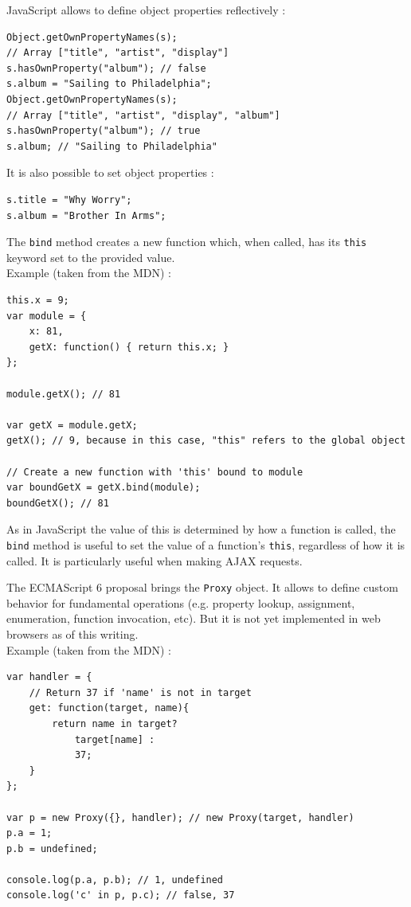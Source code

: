 \documentclass[a4paper,10pt]{article}
\begin{document}
\bigskip
JavaScript allows to define object properties reflectively :
\begin{lstlisting}
Object.getOwnPropertyNames(s);
// Array ["title", "artist", "display"]
s.hasOwnProperty("album"); // false
s.album = "Sailing to Philadelphia";
Object.getOwnPropertyNames(s);
// Array ["title", "artist", "display", "album"]
s.hasOwnProperty("album"); // true
s.album; // "Sailing to Philadelphia"
\end{lstlisting}

It is also possible to set object properties :
\begin{lstlisting}
s.title = "Why Worry";
s.album = "Brother In Arms";
\end{lstlisting}


\medskip
\label{bind}
The \lstinline|bind| method creates a new function which, when called, has its \lstinline|this| keyword set to the provided value. \\
Example (taken from the MDN) : \\
\begin{lstlisting}
this.x = 9;
var module = {
	x: 81,
	getX: function() { return this.x; }
};

module.getX(); // 81

var getX = module.getX;
getX(); // 9, because in this case, "this" refers to the global object

// Create a new function with 'this' bound to module
var boundGetX = getX.bind(module);
boundGetX(); // 81
\end{lstlisting}

As in JavaScript the value of this is determined by how a function is called, the \lstinline|bind| method is useful to set the value of a function’s \lstinline|this|, regardless of how it is called.
It is particularly useful when making AJAX requests.


The ECMAScript 6 proposal brings the \lstinline|Proxy| object.
It allows to define custom behavior for fundamental operations (e.g. property lookup, assignment, enumeration, function invocation, etc).
But it is not yet implemented in web browsers as of this writing. \\
Example (taken from the MDN) : \\
\begin{lstlisting}
var handler = {
    // Return 37 if 'name' is not in target
    get: function(target, name){
        return name in target?
            target[name] :
            37;
    }
};

var p = new Proxy({}, handler); // new Proxy(target, handler)
p.a = 1;
p.b = undefined;

console.log(p.a, p.b); // 1, undefined
console.log('c' in p, p.c); // false, 37
\end{lstlisting}
\end{document}
